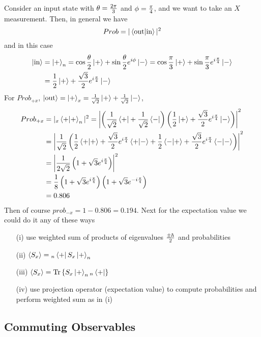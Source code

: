 \documentclass[english, 11pt]{article}
\begin{document}
     \begin{exmp}
       Consider an input state with $\theta = \frac{2\pi}{3}$ and $\phi = \frac{\pi}{4}$, and we want to take an $X$ measurement. Then, in general we have
       \[ Prob = |\braket{\mbox{out}}{\mbox{in}}|^2 \]
       and in this case
       \begin{align*}
           \left|\mbox{in}\right\rangle & = \left|+\right\rangle_n = \cos\frac{\theta}{2}\left|+\right\rangle + \sin\frac{\theta}{2}e^{i\phi}\left|-\right\rangle = \cos\frac{\pi}{3}\left|+\right\rangle + \sin\frac{\pi}{3}e^{i\frac{\pi}{4}}\left|-\right\rangle \\
                           & = \frac{1}{2}\left|+\right\rangle + \frac{\sqrt{3}}{2}e^{i\frac{\pi}{4}}\left|-\right\rangle
       \end{align*}
       For $Prob_{+x}$, $\left|\mbox{out}\right\rangle = \left|+\right\rangle_x = \frac{1}{\sqrt{2}} \left|+\right\rangle + \frac{1}{\sqrt{2}}\left|-\right\rangle$,
       \begin{align*}
         Prob_{+x} & = |{}_x\braket{+}{+}_n|^2 = \left| \left( \f{1}{\sqrt{2}}\bp + \f{1}{\sqrt{2}}\bm \right)\left( \f{1}{2}\kp + \f{\sqrt{3}}{2}e^{i\f{\pi}{4}}\km \right) \right|^2 \\
         & = \left| \f{1}{\sqrt{2}} \left( \f{1}{2}\braket{+}{+} + \f{\sqrt{3}}{2}e^{i\f{\pi}{4}}\braket{+}{-} + \f{1}{2}\braket{-}{+} + \f{\sqrt{3}}{2}e^{i\f{\pi}{4}}\braket{-}{-} \right) \right|^2 \\
         & = \left| \f{1}{2\sqrt{2}} \left( 1 + \sqrt{3}e^{i\f{\pi}{4}} \right) \right|^2 \\
         & = \f{1}{8} \left( 1 + \sqrt{3}e^{i\f{\pi}{4}} \right) \left( 1 + \sqrt{3}e^{-i\f{\pi}{4}} \right) \\
         & = 0.806
       \end{align*}
       Then of course $prob_{-x} = 1 - 0.806 = 0.194$. Next for the expectation value we could do it any of these ways
       \begin{itemize}
         \item[(i)] use weighted sum of products of eigenvalues $\frac{\pm\hbar}{2}$ and probabilities
         \item[(ii)] $\langle S_x \rangle = {}_n\left\langle+\right| S_x \left|+\right\rangle_n$
         \item[(iii)] $\langle S_x \rangle = \mbox{Tr}\left\{ S_x \left|+\right\rangle_n{}_n\left\langle+\right| \right\}$
         \item[(iv)] use projection operator (expectation value) to compute probabilities and perform weighted sum as in (i)
       \end{itemize}
     \end{exmp}

    \subsection{Commuting Observables}
\end{document}
